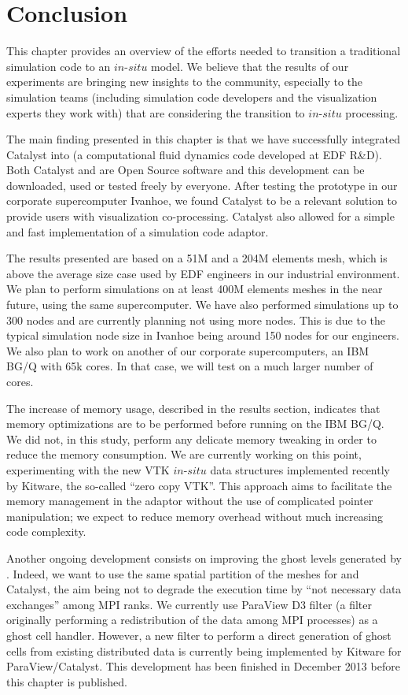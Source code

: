 \section{Conclusion}
\label{sec:conclusion}

This chapter provides an overview of the efforts needed to transition
a traditional simulation code to an $in$-$situ$ model.  We believe that the
results of our experiments are bringing new insights to the
community, especially to the simulation teams (including simulation code
developers and the visualization experts they work with) that are
considering the transition to $in$-$situ$ processing.

The main finding presented in this chapter is that we have successfully
integrated Catalyst into \CS (a computational fluid dynamics code
developed at EDF R\&D). Both Catalyst and \CS are Open Source software
and this development can be downloaded, used or tested freely by everyone. After
testing the prototype in our corporate supercomputer Ivanhoe, we found Catalyst to
be a relevant solution to provide \CS users with visualization
co-processing. Catalyst also allowed for a simple and fast implementation of a simulation code
adaptor.

The results presented are based on a 51M and a 204M elements mesh, which is
above the average size case used by EDF engineers in our industrial environment.
We plan to perform simulations on at least 400M elements meshes in the near
future, using the same supercomputer. We have also performed simulations up to
300 nodes and are currently planning not using more nodes. This is due to the
typical simulation node size in Ivanhoe being around 150 nodes for our
engineers. We also plan to work on another of our corporate supercomputers, an
IBM BG/Q with 65k cores. In that case, we will test on a much larger number of
cores.

The increase of memory usage, described in the results section, indicates that
memory optimizations are to be performed before running on the IBM BG/Q. We did
not, in this study, perform any delicate memory tweaking in order to reduce the
memory consumption. We are currently working on this point, experimenting with
the new VTK $in$-$situ$ data structures implemented recently by Kitware, the
so-called ``zero copy VTK''. This approach aims to facilitate the memory
management in the adaptor without the use of complicated pointer manipulation;
we expect to reduce memory overhead without much increasing code complexity.

Another ongoing development consists on improving the ghost levels
generated by \CS. Indeed, we want to use the same spatial partition of
the meshes for \CS and Catalyst, the aim being not to degrade the
execution time by “not necessary data exchanges” among MPI ranks. We currently
use ParaView D3 filter (a filter originally performing a redistribution of the
data among MPI processes) as a ghost cell handler. However, a new filter to perform 
a direct generation of ghost cells from existing distributed data is currently
being implemented by Kitware for ParaView/Catalyst. This development has
been finished in December 2013 before this chapter is published.


